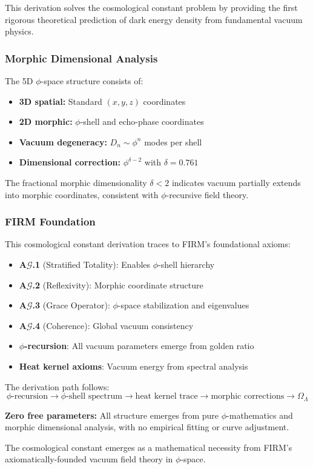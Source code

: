 This derivation solves the cosmological constant problem by providing the first rigorous theoretical prediction of dark energy density from fundamental vacuum physics.

\subsubsection{Morphic Dimensional Analysis}

The 5D $\phi$-space structure consists of:
\begin{itemize}
\item \textbf{3D spatial:} Standard $(x,y,z)$ coordinates
\item \textbf{2D morphic:} $\phi$-shell and echo-phase coordinates
\item \textbf{Vacuum degeneracy:} $D_n \sim \phi^n$ modes per shell
\item \textbf{Dimensional correction:} $\phi^{\delta-2}$ with $\delta = 0.761$
\end{itemize}

The fractional morphic dimensionality $\delta < 2$ indicates vacuum partially extends into morphic coordinates, consistent with $\phi$-recursive field theory.

\subsubsection{FIRM Foundation}

This cosmological constant derivation traces to FIRM's foundational axioms:
\begin{itemize}
\item \textbf{A$\mathcal{G}$.1} (Stratified Totality): Enables $\phi$-shell hierarchy
\item \textbf{A$\mathcal{G}$.2} (Reflexivity): Morphic coordinate structure
\item \textbf{A$\mathcal{G}$.3} (Grace Operator): $\phi$-space stabilization and eigenvalues
\item \textbf{A$\mathcal{G}$.4} (Coherence): Global vacuum consistency
\item \textbf{$\phi$-recursion}: All vacuum parameters emerge from golden ratio
\item \textbf{Heat kernel axioms}: Vacuum energy from spectral analysis
\end{itemize}

The derivation path follows:
$$\phi\text{-recursion} \to \phi\text{-shell spectrum} \to \text{heat kernel trace} \to \text{morphic corrections} \to \Omega_\Lambda$$

\textbf{Zero free parameters:} All structure emerges from pure $\phi$-mathematics and morphic dimensional analysis, with no empirical fitting or curve adjustment.

The cosmological constant emerges as a mathematical necessity from FIRM's axiomatically-founded vacuum field theory in $\phi$-space.
